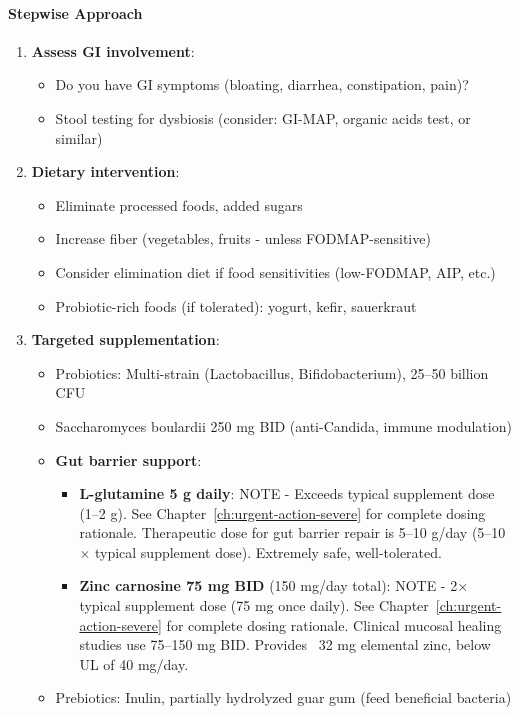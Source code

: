 \paragraph{Stepwise Approach}
\begin{enumerate}
    \item \textbf{Assess GI involvement}:
    \begin{itemize}
        \item Do you have GI symptoms (bloating, diarrhea, constipation, pain)?
        \item Stool testing for dysbiosis (consider: GI-MAP, organic acids test, or similar)
    \end{itemize}

    \item \textbf{Dietary intervention}:
    \begin{itemize}
        \item Eliminate processed foods, added sugars
        \item Increase fiber (vegetables, fruits - unless FODMAP-sensitive)
        \item Consider elimination diet if food sensitivities (low-FODMAP, AIP, etc.)
        \item Probiotic-rich foods (if tolerated): yogurt, kefir, sauerkraut
    \end{itemize}

    \item \textbf{Targeted supplementation}:
    \begin{itemize}
        \item Probiotics: Multi-strain (Lactobacillus, Bifidobacterium), 25--50 billion CFU
        \item Saccharomyces boulardii 250 mg BID (anti-Candida, immune modulation)
        \item \textbf{Gut barrier support}:
        \begin{itemize}
            \item \textbf{L-glutamine 5 g daily}: NOTE - Exceeds typical supplement dose (1--2 g). See Chapter~\ref{ch:urgent-action-severe} for complete dosing rationale. Therapeutic dose for gut barrier repair is 5--10 g/day (5--10$\times$ typical supplement dose). Extremely safe, well-tolerated.
            \item \textbf{Zinc carnosine 75 mg BID} (150 mg/day total): NOTE - 2$\times$ typical supplement dose (75 mg once daily). See Chapter~\ref{ch:urgent-action-severe} for complete dosing rationale. Clinical mucosal healing studies use 75--150 mg BID. Provides ~32 mg elemental zinc, below UL of 40 mg/day.
        \end{itemize}
        \item Prebiotics: Inulin, partially hydrolyzed guar gum (feed beneficial bacteria)
    \end{itemize}


\end{enumerate}
